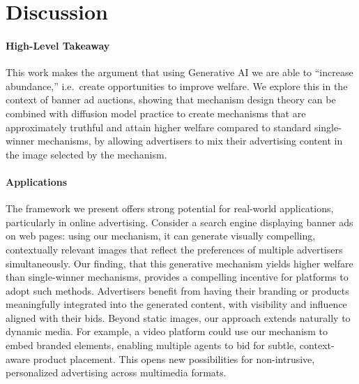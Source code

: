 \documentclass[format=acmsmall, review=false]{acmart}
\begin{document}




\section{Discussion}

\paragraph{High-Level Takeaway}
This work makes the argument that using Generative AI we are able to ``increase abundance,'' i.e.~create opportunities to improve welfare. We explore this in the context of banner ad auctions, showing that mechanism design theory can be combined with diffusion model practice to create mechanisms that are approximately truthful and attain higher welfare compared to standard single-winner mechanisms, by allowing advertisers to mix their advertising content in the image selected by the mechanism.

\paragraph{Applications} The framework we present offers strong potential for real-world applications, particularly in online advertising. Consider a search engine displaying banner ads on web pages: using our mechanism, it can generate visually compelling, contextually relevant images that reflect the preferences of multiple advertisers simultaneously. Our finding, that this generative mechanism yields higher welfare than single-winner mechanisms, provides a compelling incentive for platforms to adopt such methods. Advertisers benefit from having their branding or products meaningfully integrated into the generated content, with visibility and influence aligned with their bids. Beyond static images, our approach extends naturally to dynamic media. For example, a video platform could use our mechanism to embed branded elements, enabling multiple agents to bid for subtle, context-aware product placement. This opens new possibilities for non-intrusive, personalized advertising across multimedia formats.
\end{document}

